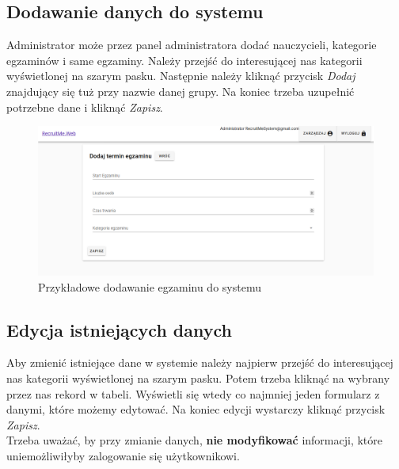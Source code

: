 \documentclass{article}
\begin{document}
\subsection{Dodawanie danych do systemu}
Administrator może przez panel administratora dodać nauczycieli, kategorie egzaminów i same egzaminy. Należy przejść do interesującej nas kategorii wyświetlonej na szarym pasku. Następnie należy kliknąć przycisk \emph{Dodaj} znajdujący się tuż przy nazwie danej grupy. Na koniec trzeba uzupełnić potrzebne dane i kliknąć \emph{Zapisz}.
\begin{figure}[H]
    \centering
    \includegraphics[width=1\linewidth]{images/web/ap_add.png}
    \caption{Przykładowe dodawanie egzaminu do systemu}
    \label{fig:test3_label}
\end{figure}

\subsection{Edycja istniejących danych}
Aby zmienić istniejące dane w systemie należy najpierw przejść do interesującej nas kategorii wyświetlonej na szarym pasku. Potem trzeba kliknąć na wybrany przez nas rekord w tabeli. Wyświetli się wtedy co najmniej jeden formularz z danymi, które możemy edytować. Na koniec edycji wystarczy kliknąć przycisk \emph{Zapisz}. \\
Trzeba uważać, by przy zmianie danych, \textbf{nie modyfikować} informacji, które uniemożliwiłyby zalogowanie się użytkownikowi.
\end{document}
